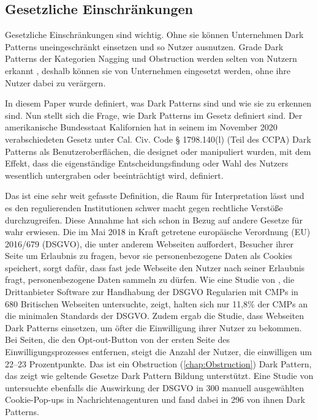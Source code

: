 \documentclass[conference,compsoc,final,a4paper]{IEEEtran}
\begin{document}



\subsection{Gesetzliche Einschränkungen}
Gesetzliche Einschränkungen sind wichtig. Ohne sie können Unternehmen Dark Patterns uneingeschränkt einsetzen und so Nutzer ausnutzen. Grade Dark Patterns der Kategorien Nagging und Obstruction werden selten von Nutzern erkannt \autocites{Gray_2018}{M.Bhoot2020}, deshalb können sie von Unternehmen eingesetzt werden, ohne ihre Nutzer dabei zu verärgern.

In diesem Paper wurde definiert, was Dark Patterns sind und wie sie zu erkennen sind. Nun stellt sich die Frage, wie Dark Patterns im Gesetz definiert sind. Der amerikanische Bundesstaat Kalifornien hat in seinem im November 2020 verabschiedeten Gesetz unter Cal. Civ. Code § 1798.140(l) (Teil des \ac{CCPA}) Dark Patterns als Benutzeroberflächen, die designet oder manipuliert wurden, mit dem Effekt, dass die eigenständige Entscheidungsfindung oder Wahl des Nutzers wesentlich untergraben oder beeinträchtigt wird, definiert.

Das ist eine sehr weit gefasste Definition, die Raum für Interpretation lässt und es den regulierenden Institutionen schwer macht gegen rechtliche Verstöße durchzugreifen. Diese Annahme hat sich schon in Bezug auf andere Gesetze für wahr erwiesen.
Die im Mai 2018 in Kraft getretene europäische Verordnung (EU) 2016/679 (\ac{DSGVO}), die unter anderem Webseiten auffordert, Besucher ihrer Seite um Erlaubnis zu fragen, bevor sie personenbezogene Daten als Cookies speichert, sorgt dafür, dass fast jede Webseite den Nutzer nach seiner Erlaubnis fragt, personenbezogene Daten sammeln zu dürfen. Wie eine Studie von \citeauthor{Nouwens2020} \autocite{Nouwens2020}, die Drittanbieter Software zur Handhabung der \ac{DSGVO} Regularien mit \acp{CMP} in 680 Britischen Webseiten untersuchte, zeigt, halten sich nur 11,8\% der \acp{CMP} an die minimalen Standards der \ac{DSGVO}. Zudem ergab die Studie, dass Webseiten Dark Patterns einsetzen, um öfter die Einwilligung ihrer Nutzer zu bekommen. Bei Seiten, die den Opt-out-Button von der ersten Seite des Einwilligungsprozesses entfernen, steigt die Anzahl der Nutzer, die einwilligen um 22–23 Prozentpunkte. Das ist ein Obstruction (\autoref{chap:Obstruction}) Dark Pattern, das zeigt wie geltende Gesetze Dark Pattern Bildung unterstützt. Eine Studie von \citeauthor{Soe2020} \autocite{Soe2020} untersuchte ebenfalls die Auswirkung der \ac{DSGVO} in 300 manuell ausgewählten Cookie-Pop-ups in Nachrichtenagenturen und fand dabei in 296 von ihnen Dark Patterns.
\end{document}
